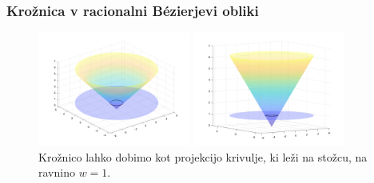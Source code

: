 \documentclass[a4paper, 12pt]{beamer}
\theoremstyle{definition}
\theoremstyle{plain}
\begin{document}
\begin{frame}
\frametitle{Krožnica v racionalni B\'ezierjevi obliki}
    
\begin{figure}[ht!]
    \begin{minipage}{0.5\textwidth}
        \centering
        \includegraphics[width=50mm]{stozec.png}
    \end{minipage}\hfill
    \begin{minipage}{0.5\textwidth}
        \centering
        \includegraphics[width=50mm]{stozec_1.png}
    \end{minipage}\hfill
    \caption{Krožnico lahko dobimo kot projekcijo krivulje, ki leži na stožcu, na ravnino $w = 1$.}
\end{figure}

\end{frame}
    
    
\end{document}
